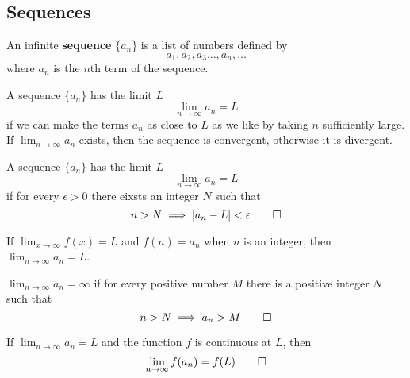 \subsection{Sequences}
An infinite \textbf{sequence} \(\{a_n\}\) is a list of numbers defined by
\[a_1,a_2,a_3\dots,a_n,\dots\]
where \(a_n\) is the \(n\)th term of the sequence.
\begin{definition}
    A sequence \(\{a_n\}\) has the limit \(L\)
    \[\lim_{n\to\infty}a_n=L\]
    if we can make the terms \(a_n\) as close to \(L\) as we like by taking
    \(n\) sufficiently large.
    If \(\lim_{n\to\infty}a_n\) exists, then the sequence is convergent,
    otherwise it is divergent.
\end{definition}
\begin{definition}
    A sequence \(\{a_n\}\) has the limit \(L\)
    \[\lim_{n\to\infty}a_n=L\]
    if for every \(\epsilon>0\) there eixsts an integer \(N\) such that
    \[n>N\implies |a_n-L|<\epsilon\qedhere\]
\end{definition}
\begin{theorem}
    If \(\lim_{x\to\infty}f(x)=L\) and \(f(n)=a_n\) when \(n\) is an integer,
    then \(\lim_{n\to\infty}a_n=L\).
\end{theorem}
\begin{definition}
    \(\lim_{n\to\infty}a_n=\infty\) if for every positive number \(M\) there
    is a positive integer \(N\) such that
    \[n>N\implies a_n>M\qedhere\]
\end{definition}
\begin{theorem}
    If \(\lim_{n\to\infty}a_n=L\) and the function \(f\) is continuous at
    \(L\), then
    \[\lim_{n\to\infty}f(a_n)=f(L)\qedhere\]
\end{theorem}